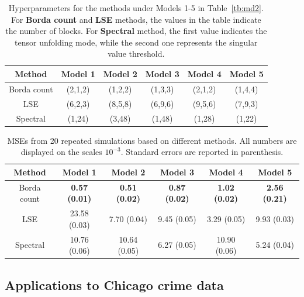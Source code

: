 \documentclass[11pt]{article}
\theoremstyle{definition}
\begin{document}
\begin{table}[ht]
    \centering
    \begin{tabular}{c|c|c|c|c|c}
        Method &  Model 1 & Model 2 & Model 3& Model 4 & Model 5  \\\hline
        Borda count &   (2,1,2)&(1,2,2)& (1,3,3) &(2,1,2)&(1,4,4)\\
        LSE &(6,2,3)&(8,5,8)&(6,9,6)&(9,5,6)&(7,9,3)\\
        Spectral & (1,24)&(3,48)&(1,48)&(1,28)&(1,22)
    \end{tabular}
    \caption{Hyperparameters for the methods under Models 1-5 in Table~\ref{tb:md2}. For {\bf \small Borda count} and {\bf \small LSE} methods, the values in the table indicate the number of blocks. For {\bf \small Spectral} method, the first value indicates the tensor unfolding mode, while the second one represents the singular value threshold.}
    \label{tb:hyper}
\end{table}


\begin{table}[ht]
    \centering
    \begin{tabular}{c|c|c|c|c|c}
        Method &  Model 1 & Model 2 & Model 3& Model 4 & Model 5  \\\hline
        Borda count &  {\bf 0.57 (0.01)}&{\bf 0.51 (0.02)}& {\bf0.87 (0.02)} &{\bf1.02 (0.02)}& {\bf2.56 (0.21)}\\
        LSE &23.58 (0.03)&7.70 (0.04)&9.45 (0.05)&3.29 (0.05)&9.93 (0.03)\\
        Spectral & 10.76 (0.06)&10.64 (0.05)&6.27 (0.05)&10.90 (0.06)&5.24 (0.04)
    \end{tabular}
    \caption{MSEs from 20 repeated simulations based on different methods. All numbers are displayed on the scales $10^{-3}$. Standard errors are reported in parenthesis.}
    \label{tb:asymresult}
\end{table}



\subsection{Applications to Chicago crime data}
\end{document}
